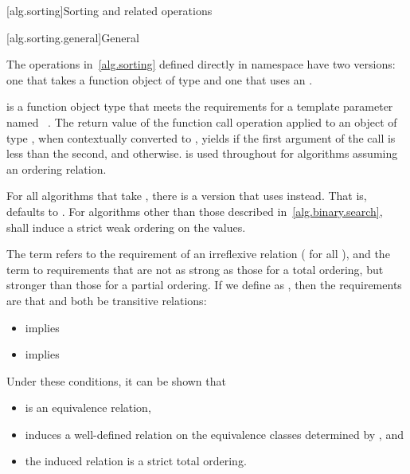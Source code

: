 [alg.sorting]{Sorting and related operations}

[alg.sorting.general]{General}

\pnum
The operations in~\ref{alg.sorting} defined directly in namespace 
have two versions:
one that takes a function object of type  and
one that uses an .

\pnum
{} is a function object type
that meets the requirements for a template parameter
named ~.
The return value of the function call operation
applied to an object of type ,
when contextually converted to ,
yields 
if the first argument of the call is less than the second, and
 otherwise.
 is used throughout
for algorithms assuming an ordering relation.

\pnum
For all algorithms that take ,
there is a version that uses  instead.
That is,  defaults to .
For algorithms other than those described in~\ref{alg.binary.search},
 shall induce a strict weak ordering on the values.

\pnum
The term  refers to the requirement
of an irreflexive relation ( for all ),
and the term  to requirements
that are not as strong as those for a total ordering,
but stronger than those for a partial ordering.
If we define  as ,
then the requirements are that  and 
both be transitive relations:
\begin{itemize}
\item {} implies 
\item {} implies 
\end{itemize}
\begin{note}
Under these conditions, it can be shown that
\begin{itemize}
\item
   is an equivalence relation,
\item
   induces a well-defined relation
  on the equivalence classes determined by , and
\item
  the induced relation is a strict total ordering.
\end{itemize}
\end{note}

